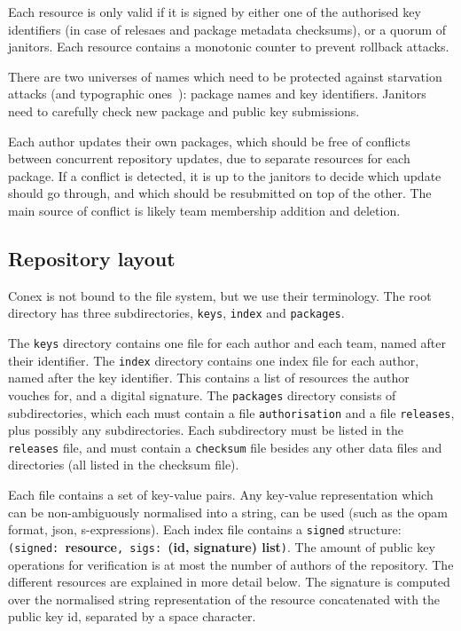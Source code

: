 \documentclass[nocopyrightspace]{sigplanconf}
\begin{document}
Each resource is only valid if it is signed by either one of the authorised key identifiers (in case of relesaes and package metadata checksums), or a quorum of janitors.
Each resource contains a monotonic counter to prevent rollback attacks.

There are two universes of names which need to be protected against starvation attacks (and typographic ones~\cite{typo}): package names and key identifiers.
Janitors need to carefully check new package and public key submissions.

Each author updates their own packages, which should be free of conflicts between concurrent repository updates, due to separate resources for each package.
If a conflict is detected, it is up to the janitors to decide which update should go through, and which should be resubmitted on top of the other.
The main source of conflict is likely team membership addition and deletion.

\subsection{Repository layout}
Conex is not bound to the file system, but we use their terminology.
The root directory has three subdirectories, \texttt{keys}, \texttt{index} and \texttt{packages}.

The \texttt{keys} directory contains one file for each author and each team, named after their identifier.
The \texttt{index} directory contains one index file for each author, named after the key identifier.  This contains a list of resources the author vouches for, and a digital signature.
The \texttt{packages} directory consists of subdirectories, which each must contain a file \texttt{authorisation} and a file \texttt{releases}, plus possibly any subdirectories.
Each subdirectory must be listed in the \texttt{releases} file, and must contain a \texttt{checksum} file besides any other data files and directories (all listed in the checksum file).

Each file contains a set of key-value pairs.
Any key-value representation which can be non-ambiguously normalised into a string, can be used (such as the opam format, json, s-expressions).
Each index file contains a \texttt{signed} structure: \texttt{(signed: }\textbf{resource}\texttt{, sigs: }\textbf{(id, signature) list}\texttt{)}.
The amount of public key operations for verification is at most the number of authors of the repository.
The different resources are explained in more detail below.
The signature is computed over the normalised string representation of the resource concatenated with the public key id, separated by a space character.
\end{document}
